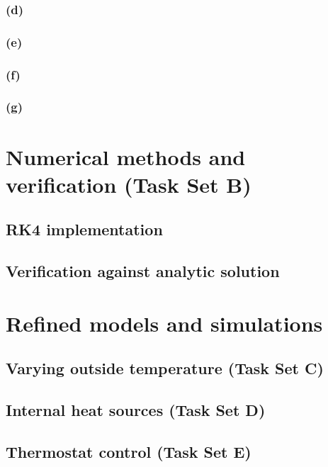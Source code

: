 \documentclass[12pt]{article}
\begin{document}
\subsubsection{(d)}
\subsubsection{(e)}
\subsubsection{(f)}
\subsubsection{(g)}

\section{Numerical methods and verification (Task Set B)}
\subsection{RK4 implementation}
\subsection{Verification against analytic solution}
\subsubsection{}

\section{Refined models and simulations}
\subsection{Varying outside temperature (Task Set C)}
\subsubsection{}
\subsection{Internal heat sources (Task Set D)}
\subsubsection{}
\subsection{Thermostat control (Task Set E)}
\end{document}
